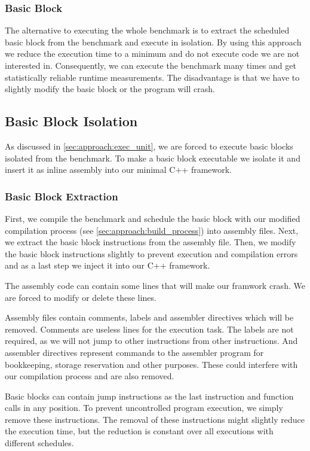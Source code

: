 \subsubsection{Basic Block}
The alternative to executing the whole benchmark is to extract the scheduled basic block from the benchmark and execute in isolation.
By using this approach we reduce the execution time to a minimum and do not execute code we are not interested in.
Consequently, we can execute the benchmark many times and get statistically reliable runtime measurements.
The disadvantage is that we have to slightly modify the basic block or the program will crash.

\subsection{Basic Block Isolation}
\label{sec:approach:bbisolation}
As discussed in \cref{sec:approach:exec_unit}, we are forced to execute basic blocks isolated from the benchmark.
To make a basic block executable we isolate it and insert it as inline assembly into our minimal C++ framework.

\subsubsection{Basic Block Extraction}
First, we compile the benchmark and schedule the basic block with our modified compilation process (see \cref{sec:approach:build_process}) into assembly files.
Next, we extract the basic block instructions from the assembly file.
Then, we modify the basic block instructions slightly to prevent execution and compilation errors and as a last step we inject it into our C++ framework.

The assembly code can contain some lines that will make our framwork crash.
We are forced to modify or delete these lines.

Assembly files contain comments, labels and assembler directives which will be removed.
Comments are useless lines for the execution task. 
The labels are not required, as we will not jump to other instructions from other instructions.
And assembler directives represent commands to the assembler program for bookkeeping, storage reservation and other purposes.
These could interfere with our compilation process and are also removed.

Basic blocks can contain jump instructions as the last instruction and function calls in any position.
To prevent uncontrolled program execution, we simply remove these instructions.
The removal of these instructions might slightly reduce the execution time, but the reduction is constant over all executions with different schedules.

